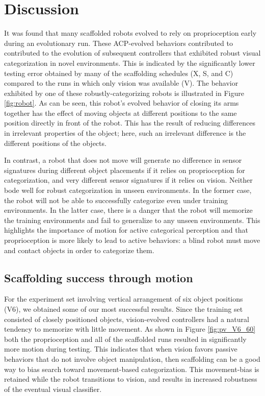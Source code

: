 \documentclass{sig-alternate}
\begin{document}
\section{Discussion}
\label{sectDiscussion}

It was found that many scaffolded robots evolved to rely on proprioception early during an evolutionary run. These ACP-evolved behaviors contributed to contributed to the evolution of subsequent controllers that
exhibited robust visual categorization in novel environments. This is indicated by the significantly lower testing error obtained by many of the scaffolding schedules (X, S, and C) compared to the runs in which only vision was available (V). The behavior exhibited by one of these robustly-categorizing robots is illustrated in Figure \ref{fig:robot}. As can be seen, this robot's evolved behavior of closing its arms together has the effect of moving objects at different positions to the same position directly in front of the robot. This has the result of reducing differences in irrelevant properties of the
object; here, such an irrelevant difference is the different positions of the objects.

In contrast, a robot that does not move will generate no difference in sensor signatures during different object placements if it relies on proprioception for categorization, and very
different sensor signatures if it relies on vision. Neither bode well for robust categorization in unseen environments. In the former case, the robot will not be able to successfully
categorize even under training environments. In the latter case, there is a danger that the robot will memorize the training environments and fail to generalize to any unseen environments. This highlights the importance of motion for active categorical perception and that proprioception is more likely to lead to active behaviors: a blind robot must move and contact objects in order to categorize them.

\subsection {Scaffolding success through motion}

For the experiment set involving vertical arrangement of six object positions (V6), we obtained some of our most successful results. Since the training set consisted of closely positioned objects, vision-evolved controllers had a natural tendency to memorize with little movement. As shown in Figure \ref{fig:pv_V6_60} both the proprioception and all of the scaffolded runs resulted in significantly more motion during testing. This indicates that when vision favors passive behaviors that do not involve object manipulation, then scaffolding can be a good way to
bias search toward movement-based categorization. This movement-bias is retained while the robot transitions to vision, and results in increased robustness of the eventual visual classifier. 
\end{document}
